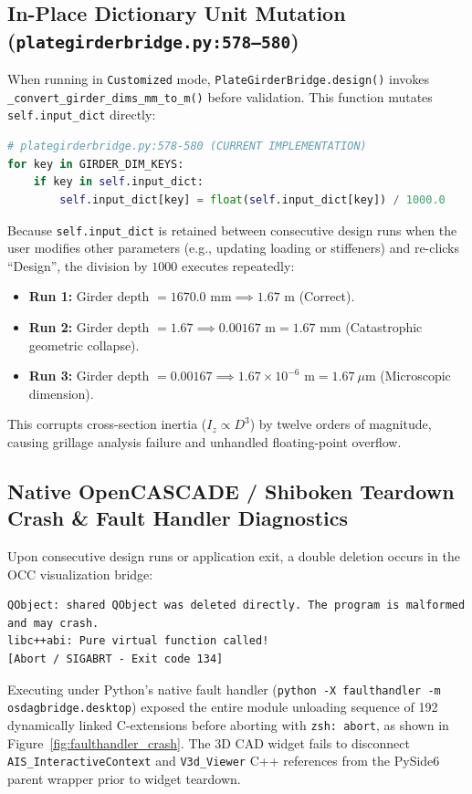 \documentclass[11pt,a4paper]{article}
\begin{document}
\subsection{In-Place Dictionary Unit Mutation (\texttt{plategirderbridge.py:578--580})}
When running in \texttt{Customized} mode, \texttt{PlateGirderBridge.design()} invokes \texttt{\_convert\_girder\_dims\_mm\_to\_m()} before validation. This function mutates \texttt{self.input\_dict} directly:
\begin{lstlisting}[language=Python]
# plategirderbridge.py:578-580 (CURRENT IMPLEMENTATION)
for key in GIRDER_DIM_KEYS:
    if key in self.input_dict:
        self.input_dict[key] = float(self.input_dict[key]) / 1000.0
\end{lstlisting}
Because \texttt{self.input\_dict} is retained between consecutive design runs when the user modifies other parameters (e.g., updating loading or stiffeners) and re-clicks ``Design'', the division by $1000$ executes repeatedly:
\begin{itemize}[noitemsep]
    \item \textbf{Run 1:} Girder depth $= 1670.0\text{ mm} \implies 1.67\text{ m}$ (Correct).
    \item \textbf{Run 2:} Girder depth $= 1.67 \implies 0.00167\text{ m} = 1.67\text{ mm}$ (Catastrophic geometric collapse).
    \item \textbf{Run 3:} Girder depth $= 0.00167 \implies 1.67\times 10^{-6}\text{ m} = 1.67\ \mu\text{m}$ (Microscopic dimension).
\end{itemize}
This corrupts cross-section inertia ($I_z \propto D^3$) by twelve orders of magnitude, causing grillage analysis failure and unhandled floating-point overflow.

\subsection{Native OpenCASCADE / Shiboken Teardown Crash \& Fault Handler Diagnostics}
Upon consecutive design runs or application exit, a double deletion occurs in the OCC visualization bridge:
\begin{verbatim}
QObject: shared QObject was deleted directly. The program is malformed and may crash.
libc++abi: Pure virtual function called!
[Abort / SIGABRT - Exit code 134]
\end{verbatim}
Executing under Python's native fault handler (\texttt{python -X faulthandler -m osdagbridge.desktop}) exposed the entire module unloading sequence of 192 dynamically linked C-extensions before aborting with \texttt{zsh: abort}, as shown in Figure~\ref{fig:faulthandler_crash}. The 3D CAD widget fails to disconnect \texttt{AIS\_InteractiveContext} and \texttt{V3d\_Viewer} C++ references from the PySide6 parent wrapper prior to widget teardown.
\end{document}
